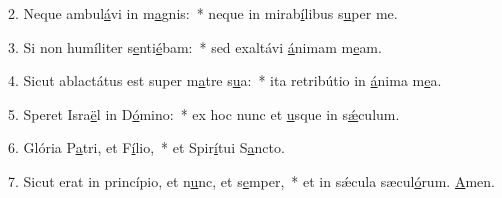 2. Neque ambul\uline{á}vi in m\uline{a}gnis:~* neque in mirab\uline{í}libus s\uline{u}per me.\par 
3. Si non humíliter s\uline{e}nti\uline{é}bam:~* sed exaltávi \uline{á}nimam m\uline{e}am.\par 
4. Sicut ablactátus est super m\uline{a}tre s\uline{u}a:~* ita retribútio in \uline{á}nima m\uline{e}a.\par 
5. Speret Isra\uline{ë}l in D\uline{ó}mino:~* ex hoc nunc et \uline{u}sque in s\uline{ǽ}culum.\par 
6. Glória P\uline{a}tri, et F\uline{í}lio,~* et Spir\uline{í}tui S\uline{a}ncto.\par 
7. Sicut erat in princípio, et n\uline{u}nc, et s\uline{e}mper,~* et in sǽcula sæcul\uline{ó}rum. \uline{A}men.\par 
